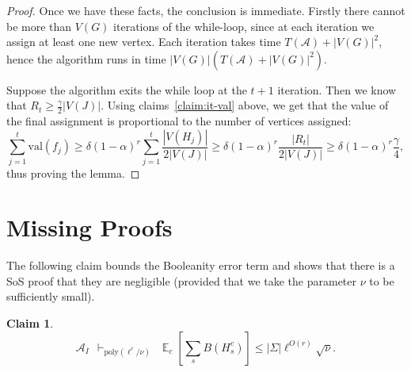 \documentclass[11pt]{article}
\DeclareMathOperator*{\E}{\mathbb{E}}
\def \cA {\mathcal{A}}
\def \sos {SoS\xspace}
\def \poly {\mathrm{poly}}
\def \val {\mathrm{val}}
\newtheorem{claim}[theorem]{Claim}
\theoremstyle{definition}
\begin{document}
\begin{proof}
Once we have these facts, the conclusion is immediate. Firstly there cannot be more than $V(G)$ iterations of the while-loop, since at each iteration we assign at least one new vertex. Each iteration takes time $T(\cA) + |V(G)|^2$, hence the algorithm runs in time $|V(G)|(T(\cA) + |V(G)|^2)$. 

Suppose the algorithm exits the while loop at the $t+1$ iteration. Then we know that $R_{t} \geq \frac{\gamma}{2}|V(J)|$.
Using claims~\ref{claim:it-val} above, we get that the value of the final assignment is proportional to the number of vertices assigned: 
\[\sum_{j=1}^t\val(f_j) \geq \delta(1 - \alpha)^r \sum_{j=1}^t \frac{|V(H_j)|}{2|V(J)|} \geq \delta(1 - \alpha)^r\frac{|R_t|}{2|V(J)|} \geq \delta(1 - \alpha)^r\frac{\gamma}{4},\]
thus proving the lemma.
\end{proof}
\section{Missing Proofs}\label{sec:missing_pfs}

The following claim bounds the Booleanity error term 
and shows that there is a \sos proof that they are
negligible (provided that we take the parameter $\nu$ 
to be sufficiently small).
\begin{claim}\label{claim:bool}
\[\cA_I ~~ \vdash_{\poly(\ell^r/\nu)} ~~ \E_{c}[\sum_s B(H^c_s)] \leq |\Sigma|\ell^{O(r)}\sqrt{\nu}.\]
\end{claim}
\end{document}
